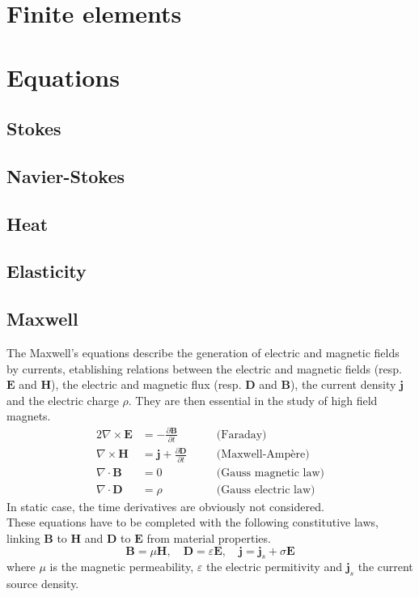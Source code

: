\documentclass{article}
\newcommand{\bE}{\mathbf{E}}
\newcommand{\bH}{\mathbf{H}}
\newcommand{\bD}{\mathbf{D}}
\newcommand{\bB}{\mathbf{B}}
\newcommand{\bj}{\mathbf{j}}
\begin{document}
\section{Finite elements}

\section{Equations}
\subsection{Stokes}
\subsection{Navier-Stokes}
\subsection{Heat}
\subsection{Elasticity}
\subsection{Maxwell}
The Maxwell's equations describe the generation of electric and magnetic fields
by currents, etablishing relations between the electric and magnetic fields
(resp. $\bE$ and $\bH$), the electric and magnetic flux (resp. $\bD$ and $\bB$),
the current density $\bj$ and the electric charge $\rho$. They are then
essential in the study of high field magnets.
\begin{alignat}{2}
  \nabla \times \bE &= -\frac{\partial \bB}{\partial t}
  &&\quad\text{(Faraday)} \label{eq:faraday} \\
  \nabla \times \bH &= \bj +\frac{\partial \bD}{\partial t}
  &&\quad\text{(Maxwell-Ampère)} \label{eq:maxwell-ampere} \\
  \nabla \cdot \bB &= 0
  &&\quad\text{(Gauss magnetic law)} \label{eq:gauss_magnetic_law} \\
  \nabla \cdot \bD &= \rho
  &&\quad\text{(Gauss electric law)} \label{eq:gauss_electric_law}
\end{alignat}
In static case, the time derivatives are obviously not considered. \\

These equations have to be completed with the following constitutive laws,
linking $\bB$ to $\bH$ and $\bD$ to $\bE$ from material properties.
\begin{equation}
  \label{eq:constitutive-laws}
  \bB = \mu \bH, \quad \bD = \varepsilon \bE, \quad \bj = \bj_s + \sigma \bE
\end{equation}
where $\mu$ is the magnetic permeability, $\varepsilon$ the electric permitivity
and $\bj_s$ the current source density. \\
\end{document}
